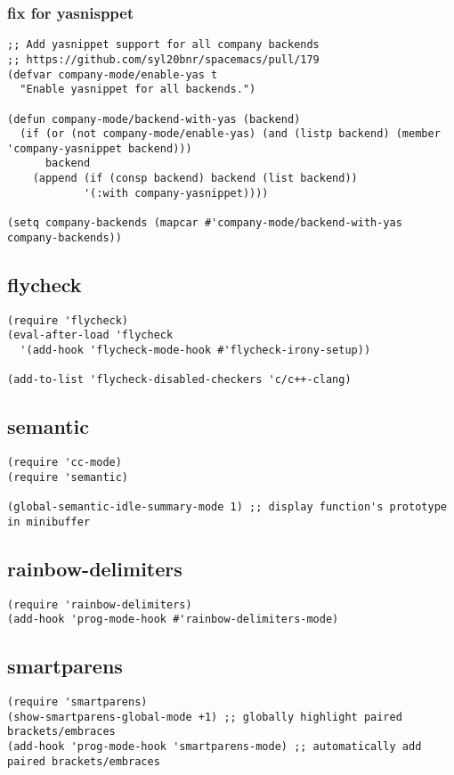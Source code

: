 \documentclass[11pt]{article}
\begin{document}
\subsubsection{fix for yasnisppet}
\label{sec-2-21-2}
\begin{verbatim}
;; Add yasnippet support for all company backends
;; https://github.com/syl20bnr/spacemacs/pull/179
(defvar company-mode/enable-yas t
  "Enable yasnippet for all backends.")

(defun company-mode/backend-with-yas (backend)
  (if (or (not company-mode/enable-yas) (and (listp backend) (member 'company-yasnippet backend)))
      backend
    (append (if (consp backend) backend (list backend))
            '(:with company-yasnippet))))

(setq company-backends (mapcar #'company-mode/backend-with-yas company-backends))
\end{verbatim}
\subsection{flycheck}
\label{sec-2-22}
\begin{verbatim}
(require 'flycheck)
(eval-after-load 'flycheck
  '(add-hook 'flycheck-mode-hook #'flycheck-irony-setup))

(add-to-list 'flycheck-disabled-checkers 'c/c++-clang)
\end{verbatim}
\subsection{semantic}
\label{sec-2-23}
\begin{verbatim}
(require 'cc-mode)
(require 'semantic)

(global-semantic-idle-summary-mode 1) ;; display function's prototype in minibuffer
\end{verbatim}
\subsection{rainbow-delimiters}
\label{sec-2-24}
\begin{verbatim}
(require 'rainbow-delimiters)
(add-hook 'prog-mode-hook #'rainbow-delimiters-mode)
\end{verbatim}
\subsection{smartparens}
\label{sec-2-25}
\begin{verbatim}
(require 'smartparens)
(show-smartparens-global-mode +1) ;; globally highlight paired brackets/embraces
(add-hook 'prog-mode-hook 'smartparens-mode) ;; automatically add paired brackets/embraces
\end{verbatim}
\end{document}
